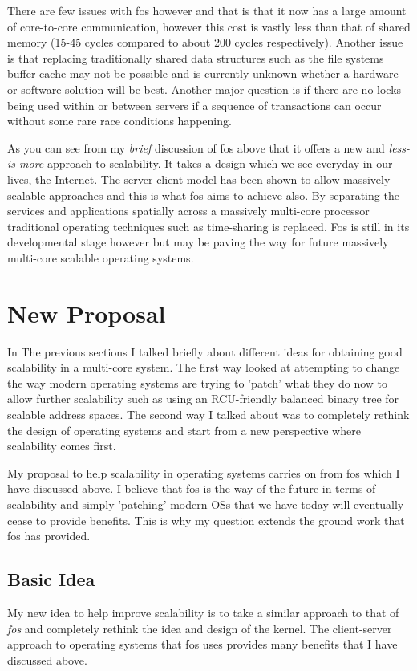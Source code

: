 \documentclass[journal]{IEEEtran}
\begin{document}
There are few issues with fos however and that is that it now has a large amount of core-to-core communication, however this cost is vastly less than that of shared memory (15-45 cycles compared to about 200 cycles respectively). Another issue is that replacing traditionally shared data structures such as the file systems buffer cache may not be possible and is currently unknown whether a hardware or software solution will be best. Another major question is if there are no locks being used within or between servers if a sequence of transactions can occur without some rare race conditions happening.

As you can see from my \emph{brief} discussion of fos above that it offers a new and \emph{less-is-more} approach to scalability. It takes a design which we see everyday in our lives, the Internet. The server-client model has been shown to allow massively scalable approaches and this is what fos aims to achieve also. By separating the services and applications spatially across a massively multi-core processor traditional operating techniques such as time-sharing is replaced. Fos is still in its developmental stage however but may be paving the way for future massively multi-core scalable operating systems.

\section{New Proposal}

In The previous sections I talked briefly about different ideas for obtaining good scalability in a multi-core system. The first way looked at attempting to change the way modern operating systems are trying to 'patch' what they do now to allow further scalability such as using an RCU-friendly balanced binary tree for scalable address spaces. The second way I talked about was to completely rethink the design of operating systems and start from a new perspective where scalability comes first. 

My proposal to help scalability in operating systems carries on from fos which I have discussed above. I believe that fos is the way of the future in terms of scalability and simply 'patching' modern OSs that we have today will eventually cease to provide benefits. This is why my question extends the ground work that fos has provided.

\subsection{Basic Idea}
My new idea to help improve scalability is to take a similar approach to that of \emph{fos} \cite{fos} and completely rethink the idea and design of the kernel. The client-server approach to operating systems that fos uses provides many benefits that I have discussed above. 
\end{document}
